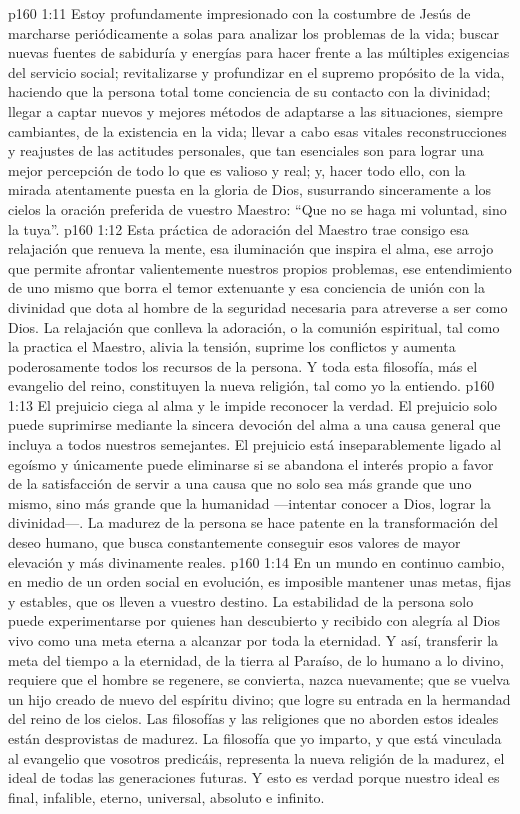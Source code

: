 \vs p160 1:11 Estoy profundamente impresionado con la costumbre de Jesús de marcharse periódicamente a solas para analizar los problemas de la vida; buscar nuevas fuentes de sabiduría y energías para hacer frente a las múltiples exigencias del servicio social; revitalizarse y profundizar en el supremo propósito de la vida, haciendo que la persona total tome conciencia de su contacto con la divinidad; llegar a captar nuevos y mejores métodos de adaptarse a las situaciones, siempre cambiantes, de la existencia en la vida; llevar a cabo esas vitales reconstrucciones y reajustes de las actitudes personales, que tan esenciales son para lograr una mejor percepción de todo lo que es valioso y real; y, hacer todo ello, con la mirada atentamente puesta en la gloria de Dios, susurrando sinceramente a los cielos la oración preferida de vuestro Maestro: “Que no se haga mi voluntad, sino la tuya”.
\vs p160 1:12 Esta práctica de adoración del Maestro trae consigo esa relajación que renueva la mente, esa iluminación que inspira el alma, ese arrojo que permite afrontar valientemente nuestros propios problemas, ese entendimiento de uno mismo que borra el temor extenuante y esa conciencia de unión con la divinidad que dota al hombre de la seguridad necesaria para atreverse a ser como Dios. La relajación que conlleva la adoración, o la comunión espiritual, tal como la practica el Maestro, alivia la tensión, suprime los conflictos y aumenta poderosamente todos los recursos de la persona. Y toda esta filosofía, más el evangelio del reino, constituyen la nueva religión, tal como yo la entiendo.
\vs p160 1:13 \pc El prejuicio ciega al alma y le impide reconocer la verdad. El prejuicio solo puede suprimirse mediante la sincera devoción del alma a una causa general que incluya a todos nuestros semejantes. El prejuicio está inseparablemente ligado al egoísmo y únicamente puede eliminarse si se abandona el interés propio a favor de la satisfacción de servir a una causa que no solo sea más grande que uno mismo, sino más grande que la humanidad ---intentar conocer a Dios, lograr la divinidad---. La madurez de la persona se hace patente en la transformación del deseo humano, que busca constantemente conseguir esos valores de mayor elevación y más divinamente reales.
\vs p160 1:14 En un mundo en continuo cambio, en medio de un orden social en evolución, es imposible mantener unas metas, fijas y estables, que os lleven a vuestro destino. La estabilidad de la persona solo puede experimentarse por quienes han descubierto y recibido con alegría al Dios vivo como una meta eterna a alcanzar por toda la eternidad. Y así, transferir la meta del tiempo a la eternidad, de la tierra al Paraíso, de lo humano a lo divino, requiere que el hombre se regenere, se convierta, nazca nuevamente; que se vuelva un hijo creado de nuevo del espíritu divino; que logre su entrada en la hermandad del reino de los cielos. Las filosofías y las religiones que no aborden estos ideales están desprovistas de madurez. La filosofía que yo imparto, y que está vinculada al evangelio que vosotros predicáis, representa la nueva religión de la madurez, el ideal de todas las generaciones futuras. Y esto es verdad porque nuestro ideal es final, infalible, eterno, universal, absoluto e infinito.
